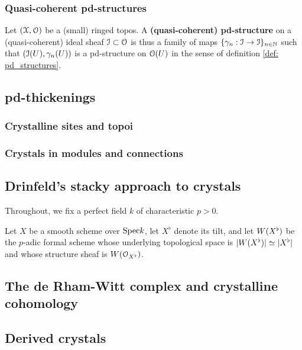         \subsubsection{Quasi-coherent pd-structures}
            \begin{definition} \label{def: quasi_coherent_pd_structures}
                Let $(\mathcal{X}, \mathcal{O})$ be a (small) ringed topos. A \textbf{(quasi-coherent) pd-structure} on a (quasi-coherent) ideal sheaf $\mathcal{I} \subset \mathcal{O}$ is thus a family of maps $\{\gamma_n: \mathcal{I} \to \mathcal{I}\}_{n \in \mathbb{N}}$ such that $(\mathcal{I}(U), \gamma_n(U))$ is a pd-structure on $\mathcal{O}(U)$ in the sense of definition \ref{def: pd_structures}. 
            \end{definition}
                
    \subsection{pd-thickenings}
        \subsubsection{Crystalline sites and topoi}
        
        \subsubsection{Crystals in modules and connections}
            
    \subsection{Drinfeld's stacky approach to crystals}
        \begin{convention}
            Throughout, we fix a perfect field $k$ of characteristic $p > 0$.
        \end{convention}
        
        Let $X$ be a smooth scheme over $\mathrm{Spec} k$, let $X^{\flat}$ denote its tilt, and let $W(X^{\flat})$ be the $p$-adic formal scheme whose underlying topological space is $|W(X^{\flat})| \simeq |X^{\flat}|$ and whose structure sheaf is $W(\mathcal{O}_{X^{\flat}})$. 
    
    \subsection{The de Rham-Witt complex and crystalline cohomology}
    
    \subsection{Derived crystals}